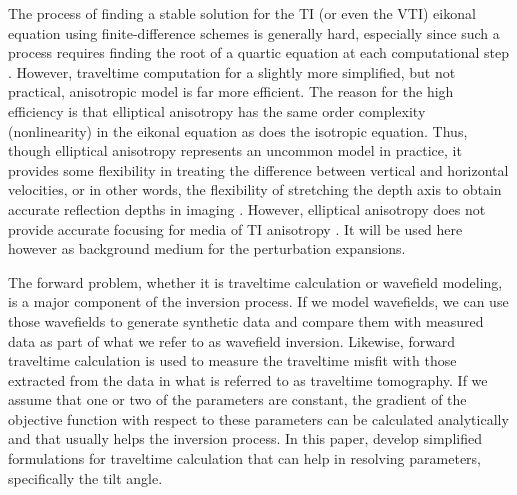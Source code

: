 The process of finding a stable solution for
the TI (or even the VTI) eikonal equation using finite-difference schemes is
generally hard, especially since such a process requires finding the root of a quartic
equation at each computational step \cite[]{wang:T129}. However, traveltime computation for a 
slightly more simplified, but not practical,  anisotropic model is far more efficient. The reason for the high efficiency
is that elliptical anisotropy has the
same order  complexity (nonlinearity) in the eikonal equation as does the isotropic equation. Thus, though elliptical
anisotropy represents an uncommon model in practice, 
it provides some flexibility in treating the difference between
vertical and horizontal velocities, or in other words, the flexibility of stretching the depth axis
to obtain accurate reflection depths in imaging
\cite[]{TLE20-05-05240527,GEO60-05-14951513,ohlsen:1600}. 
However, elliptical anisotropy does not provide accurate focusing
for media of  TI anisotropy \cite[]{GEO59-09-14051418}.
 It will be used here however as 
  background medium \geosout{)} for the perturbation
 expansions.

The forward problem, whether it is traveltime calculation or wavefield modeling,  is a major component of the inversion process. If we model wavefields,
we can use those wavefields to generate synthetic data and compare them with measured data as part of what we refer to as wavefield inversion.
Likewise, forward traveltime calculation is used to measure the traveltime misfit with those extracted from the data in what is referred to as
traveltime tomography. If we assume that one or two of the parameters are constant, the gradient of the objective function with respect to these parameters
can be calculated analytically and that usually
helps the inversion process. In this paper,   develop simplified formulations for traveltime calculation that can help in resolving
  parameters, specifically the tilt angle.

